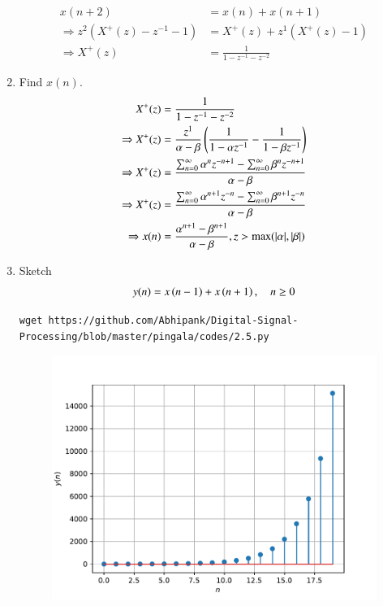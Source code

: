 \documentclass[journal,12pt,twocolumn]{IEEEtran}
\renewcommand\thesection{\arabic{section}}
\begin{document}
\begin{enumerate}[label=\thesection.\arabic*,ref=\thesection.\theenumi]
\begin{align}
	x(n+2)&=x(n)+x(n+1)\\
	\Rightarrow z^{2}(X^{+}(z)-z^{-1}-1)&=X^{+}(z)+z^{1}(X^{+}(z)-1)\\
    \Rightarrow X^{+}(z)&=\frac{1}{1-z^{-1}-z^{-2}}
\end{align}
	\item Find $x(n)$.\\
	\solution
	\begin{align}
	 X^{+}(z)&=\frac{1}{1-z^{-1}-z^{-2}}\\
	 \Rightarrow X^{+}(z)&=\frac{z^{1}}{\alpha-\beta}\left(\frac{1}{1-\alpha z^{-1}}-\frac{1}{1-\beta z^{-1}}\right)\\
	 \Rightarrow X^{+}(z)&=\frac{\sum_{n = 0}^{\infty}\alpha^{n}z^{-n+1}-\sum_{n = 0}^{\infty}\beta^{n}z^{-n+1}}{\alpha-\beta}\\
	 \Rightarrow X^{+}(z)&=\frac{\sum_{n = 0}^{\infty}\alpha^{n+1}z^{-n}-\sum_{n =0}^{\infty}\beta^{n+1}z^{-n}}{\alpha-\beta}\\
	\Rightarrow x(n)&=\frac{\alpha^{n+1}-\beta^{n+1}}{\alpha-\beta},z> \max(|\alpha|,|\beta|)
	\end{align}
	\item Sketch 
\begin{align}
	y(n)	 = x\left(n-1\right) + x\left(n+1\right),  \quad n \ge 0
	\label{eq:10-orig-diff-rev}
\end{align}
\solution
\begin{lstlisting}
wget https://github.com/Abhipank/Digital-Signal-Processing/blob/master/pingala/codes/2.5.py	
\end{lstlisting}
\begin{figure}[!ht]
	\begin{center}
	\includegraphics[width=\columnwidth]{./figs/yplot}

\end{center}
\end{figure}
\end{enumerate}
\end{document}
